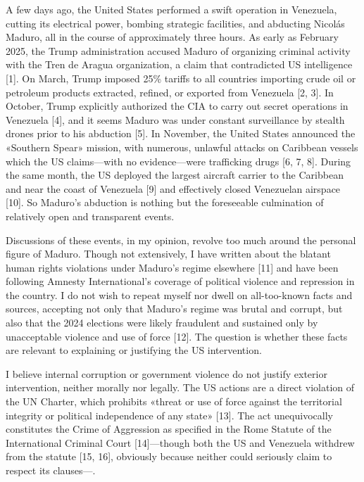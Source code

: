 \documentclass[a4paper, 12pt]{article}
\begin{document}
A few days ago, the United States performed a swift operation in Venezuela,
cutting its electrical power, bombing strategic facilities, and abducting
Nicolás Maduro, all in the course of approximately three hours. As early as
February 2025, the Trump administration accused Maduro of organizing criminal
activity with the Tren de Aragua organization, a claim that contradicted
US intelligence [1]. On March, Trump imposed 25\% tariffs to
all countries importing crude oil or petroleum products extracted, refined, or
exported from Venezuela [2, 3]. In October, Trump explicitly authorized the CIA
to carry out secret operations in Venezuela [4], and it seems Maduro
was under constant surveillance by stealth drones prior to his abduction [5]. In
November, the United States announced the «Southern Spear» mission, with
numerous, unlawful attacks on Caribbean vessels which the US claims---with no
evidence---were trafficking drugs [6, 7, 8]. During the same month, the US
deployed the largest aircraft carrier to the Caribbean and near the coast of
Venezuela [9] and effectively closed Venezuelan airspace [10]. So Maduro's
abduction is nothing but the foreseeable culmination of relatively open and
transparent events.

Discussions of these events, in my opinion, revolve too much around the
personal figure of Maduro. Though not extensively, I have written about the
blatant human rights violations under Maduro's regime elsewhere [11] and have
been following Amnesty International's coverage of political violence and
repression in the country. I do not wish to repeat myself nor dwell on
all-too-known facts and sources, accepting not only that Maduro's regime was
brutal and corrupt, but also that the 2024 elections were likely fraudulent and
sustained only by unacceptable violence and use of force [12]. The question is
whether these facts are relevant to explaining or justifying the US intervention.

I believe internal corruption or government violence do not justify exterior
intervention, neither morally nor legally. The US actions are a direct violation
of the UN Charter, which prohibits «threat or use of force against the
territorial integrity or political independence of any state» [13]. The act
unequivocally constitutes the Crime of Aggression as specified in the Rome
Statute of the International Criminal Court [14]---though both the US and
Venezuela withdrew from the statute [15, 16], obviously because neither could
seriously claim to respect its clauses---.
\end{document}
